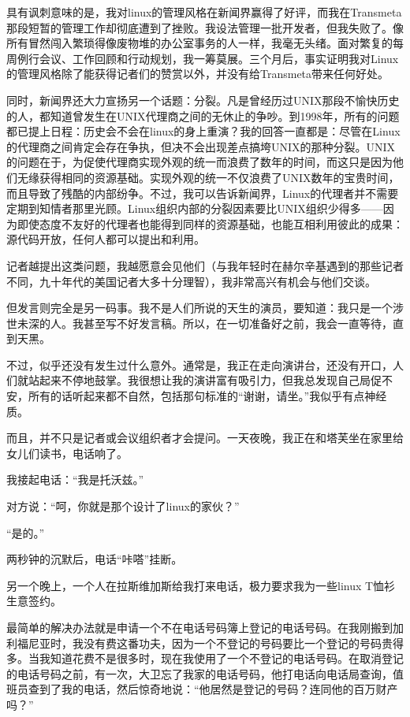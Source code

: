 具有讽刺意味的是，我对linux的管理风格在新闻界赢得了好评，而我在Transmeta那段短暂的管理工作却彻底遭到了挫败。我设法管理一批开发者，但我失败了。像所有冒然闯入繁琐得像废物堆的办公室事务的人一样，我毫无头绪。面对繁复的每周例行会议、工作回顾和行动规划，我一筹莫展。三个月后，事实证明我对Linux的管理风格除了能获得记者们的赞赏以外，并没有给Transmeta带来任何好处。

同时，新闻界还大力宣扬另一个话题：分裂。凡是曾经历过UNIX那段不愉快历史的人，都知道曾发生在UNIX代理商之间的无休止的争吵。到1998年，所有的问题都已提上日程：历史会不会在linux的身上重演？我的回答一直都是：尽管在Linux的代理商之间肯定会存在争执，但决不会出现差点搞垮UNIX的那种分裂。UNIX的问题在于，为促使代理商实现外观的统一而浪费了数年的时间，而这只是因为他们无缘获得相同的资源基础。实现外观的统一不仅浪费了UNIX数年的宝贵时间，而且导致了残酷的内部纷争。不过，我可以告诉新闻界，Linux的代理者并不需要定期到知情者那里光顾。Linux组织内部的分裂因素要比UNIX组织少得多——因为即使态度不友好的代理者也能得到同样的资源基础，也能互相利用彼此的成果：源代码开放，任何人都可以提出和利用。

记者越提出这类问题，我越愿意会见他们（与我年轻时在赫尔辛基遇到的那些记者不同，九十年代的美国记者大多十分理智），我非常高兴有机会与他们交谈。

但发言则完全是另一码事。我不是人们所说的天生的演员，要知道：我只是一个涉世未深的人。我甚至写不好发言稿。所以，在一切准备好之前，我会一直等待，直到天黑。

不过，似乎还没有发生过什么意外。通常是，我正在走向演讲台，还没有开口，人们就站起来不停地鼓掌。我很想让我的演讲富有吸引力，但我总发现自己局促不安，所有的话听起来都不自然，包括那句标准的“谢谢，请坐。”我似乎有点神经质。

而且，并不只是记者或会议组织者才会提问。一天夜晚，我正在和塔芙坐在家里给女儿们读书，电话响了。

我接起电话：“我是托沃兹。”

对方说：“呵，你就是那个设计了linux的家伙？”

“是的。”

两秒钟的沉默后，电话“咔嗒”挂断。

另一个晚上，一个人在拉斯维加斯给我打来电话，极力要求我为一些linux T恤衫生意签约。

最简单的解决办法就是申请一个不在电话号码簿上登记的电话号码。在我刚搬到加利福尼亚时，我没有费这番功夫，因为一个不登记的号码要比一个登记的号码贵得多。当我知道花费不是很多时，现在我使用了一个不登记的电话号码。在取消登记的电话号码之前，有一次，大卫忘了我家的电话号码，他打电话向电话局查询，值班员查到了我的电话，然后惊奇地说：“他居然是登记的号码？连同他的百万财产吗？”

